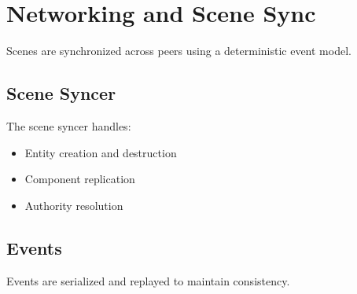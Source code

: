 \section{Networking and Scene Sync}

Scenes are synchronized across peers using a deterministic event model.

\subsection{Scene Syncer}
The scene syncer handles:
\begin{itemize}
	\item Entity creation and destruction
	\item Component replication
	\item Authority resolution
\end{itemize}

\subsection{Events}
Events are serialized and replayed to maintain consistency.
